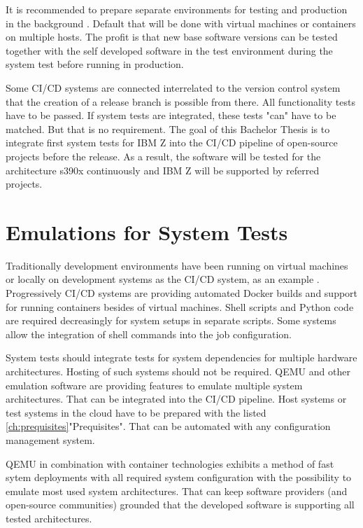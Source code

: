 It is recommended to prepare separate environments for testing and production in the background \cite[~p.120]{Scholl2019}. 
Default that will be done with virtual machines or containers on multiple hosts. The profit is that new base software versions can be tested together with the self developed software in the test environment during the system test before running in production.

Some CI/CD systems are connected interrelated to the version control system that the creation of a release branch is possible from there. All functionality tests have to be passed.  If system tests are integrated, these tests "can" have to be matched. But that is no requirement. The goal of this Bachelor Thesis is to integrate first system tests for IBM Z into the CI/CD pipeline of open-source projects before the release. As a result, the software will be tested for the architecture s390x continuously and IBM Z will be supported by referred projects.

\section{Emulations for System Tests}

Traditionally development environments have been running on virtual machines or locally on development systems as the CI/CD system, as an example \cite[~p.123]{Scholl2019}. Progressively CI/CD systems are providing automated Docker builds and support for running containers besides of virtual machines. 
Shell scripts and Python code are required decreasingly for system setups in separate scripts. Some systems allow the integration of shell commands into the job configuration.

System tests should integrate tests for system dependencies for multiple hardware architectures. Hosting of such systems should not be required. QEMU and other emulation software are providing features to emulate multiple system architectures.
That can be integrated into the CI/CD pipeline. Host systems or test systems in the cloud have to be prepared with the listed \ref{ch:prequisites}"Prequisites". That can be automated with any configuration management system.

QEMU in combination with container technologies exhibits a method of fast sytem deployments with all required system configuration with the possibility to emulate most used system architectures. That can keep software providers (and open-source communities) grounded that the developed software is supporting all tested architectures.